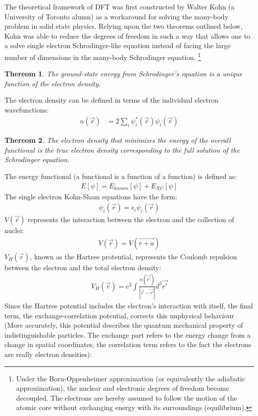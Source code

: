 \documentclass{article}
\newtheorem{mydef}{Thereom}
\numberwithin{equation}{section}
\begin{document}
The theoretical framework of DFT was first constructed by Walter Kohn (a University of Toronto alumn) as a workaround for solving the many-body problem in solid state physics. Relying upon the two theorems outlined below, Kohn was able to reduce the degrees of freedom in such a way that allows one to a solve single electron Schrodinger-like equation instead of facing the large number of dimensions in the many-body Schrodinger equation. \footnote{Under the Born-Oppenheimer approximation (or equivalently the adiabatic approximation), the nuclear and electronic degrees of freedom become decoupled. The electrons are hereby assumed to follow the motion of the atomic core without exchanging energy with its surroundings (equilibrium).}
\begin{mydef}The ground-state energy from Schrodinger's equation is a unique function of the electron density.
\end{mydef}
The electron density can be defined in terms of the individual electron wavefunctions:
\begin{align*}
	n(\vec{r})&=2\sum_i\psi_i^*(\vec{r})\psi_i(\vec{r})
\end{align*}
\begin{mydef}The electron density that minimizes the energy of the overall functional is the true electron density corresponding to the full solution of the Schrodinger equation.
\end{mydef}
The energy functional (a functional is a function of a function) is defined as:
\begin{align*}
	E[\psi]=E_{known}[\psi]+E_{XC}[\psi]
\end{align*}
The single electron Kohn-Sham equations have the form:
\begin{align*}
	[\frac{\hbar^2}{2m}\nabla^2+V(\vec{r})+V_H(\vec{r})+V_{XC}]\psi_i(\vec{r})=\epsilon_i\psi_i(\vec{r})
\end{align*}
$V(\vec{r})$ represents the interaction between the electron and the collection of nuclei:
\begin{align*}
	V(\vec{r})=V(\vec{r+a})
\end{align*}
$V_H(\vec{r})$, known as the Hartree protential, represents the Coulomb repulsion between the electron and the total electron density:
\begin{align*}
	V_H(\vec{r})=e^2\int\frac{n(\vec{r'})}{|\vec{r}-\vec{r'}|}d^3\vec{r'}
\end{align*}
Since the Hartree potential includes the electron's interaction with itself, the final term, the exchange-correlation potential, corrects this unphysical behaviour (More accurately, this potential describes the quantum mechanical property of indistinguishable particles. The exchange part refers to the energy change from a change in spatial coordinates, the correlation term refers to the fact the electrons are really electron densities):
\end{document}
